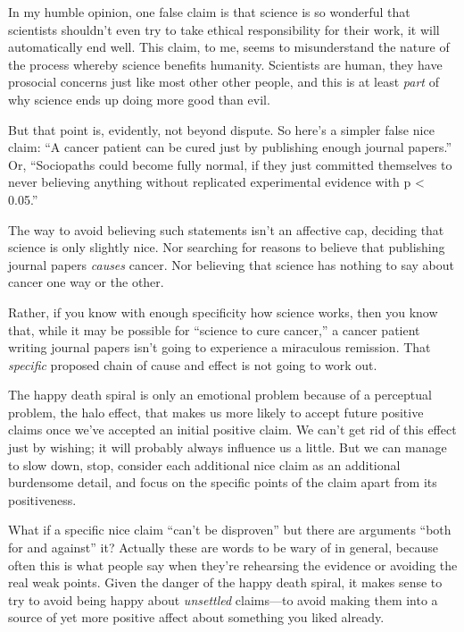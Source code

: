 {
 In my humble opinion, one false claim is that science is so
wonderful that scientists shouldn't even try to take
ethical responsibility for their work, it will automatically end well.
This claim, to me, seems to misunderstand the nature of the process
whereby science benefits humanity. Scientists are human, they have
prosocial concerns just like most other other people, and this is at
least \textit{part} of why science ends up doing more good than evil.}

{
 But that point is, evidently, not beyond dispute. So
here's a simpler false nice claim: ``A
cancer patient can be cured just by publishing enough journal
papers.'' Or, ``Sociopaths could
become fully normal, if they just committed themselves to never
believing anything without replicated experimental evidence with p
{\textless} 0.05.''}

{
 The way to avoid believing such statements isn't
an affective cap, deciding that science is only slightly nice. Nor
searching for reasons to believe that publishing journal papers
\textit{causes} cancer. Nor believing that science has nothing to say
about cancer one way or the other.}

{
 Rather, if you know with enough specificity how science works,
then you know that, while it may be possible for
``science to cure cancer,'' a cancer
patient writing journal papers isn't going to
experience a miraculous remission. That \textit{specific} proposed
chain of cause and effect is not going to work out.}

{
 The happy death spiral is only an emotional problem because of a
perceptual problem, the halo effect, that makes us more likely to
accept future positive claims once we've accepted an
initial positive claim. We can't get rid of this effect
just by wishing; it will probably always influence us a little. But we
can manage to slow down, stop, consider each additional nice claim as
an additional burdensome detail, and focus on the specific points of
the claim apart from its positiveness.}

{
 What if a specific nice claim
``can't be
disproven'' but there are arguments
``both for and against'' it?
Actually these are words to be wary of in general, because often this
is what people say when they're rehearsing the evidence
or avoiding the real weak points. Given the danger of the happy death
spiral, it makes sense to try to avoid being happy about
\textit{unsettled} claims---to avoid making them into a source of yet
more positive affect about something you liked already.}

